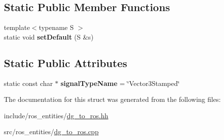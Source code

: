 \subsection*{Static Public Member Functions}
\begin{DoxyCompactItemize}
\item 
\mbox{\label{structdynamic__graph_1_1DgToRos_3_01std_1_1pair_3_01specific_1_1Vector3_00_01Vector_01_4_01_4_a85e4b5b1a35534adb8584c723bf93a7c}} 
{\footnotesize template$<$typename S $>$ }\\static void {\bfseries set\+Default} (S \&s)
\end{DoxyCompactItemize}
\subsection*{Static Public Attributes}
\begin{DoxyCompactItemize}
\item 
\mbox{\label{structdynamic__graph_1_1DgToRos_3_01std_1_1pair_3_01specific_1_1Vector3_00_01Vector_01_4_01_4_a39142c1dac9d7e9aab9230dce9a6fd79}} 
static const char $\ast$ {\bfseries signal\+Type\+Name} = \char`\"{}Vector3\+Stamped\char`\"{}
\end{DoxyCompactItemize}


The documentation for this struct was generated from the following files\+:\begin{DoxyCompactItemize}
\item 
include/ros\+\_\+entities/\hyperlink{dg__to__ros_8hh}{dg\+\_\+to\+\_\+ros.\+hh}\item 
src/ros\+\_\+entities/\hyperlink{dg__to__ros_8cpp}{dg\+\_\+to\+\_\+ros.\+cpp}\end{DoxyCompactItemize}

